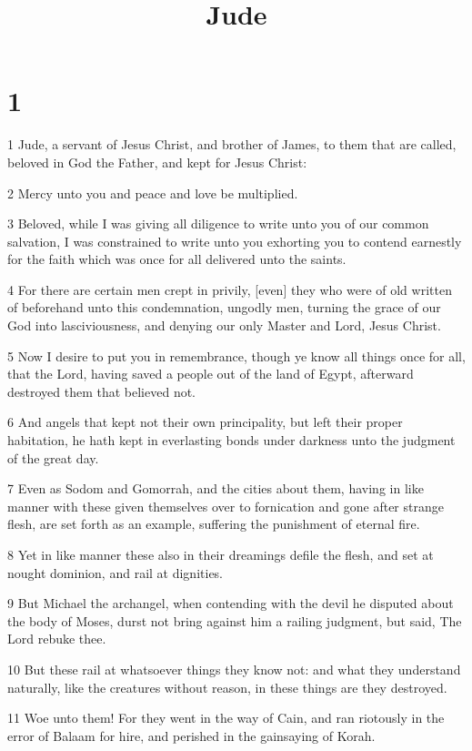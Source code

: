 

\title{Jude}

\chapter{1}

\par 1 Jude, a servant of Jesus Christ, and brother of James, to them that are called, beloved in God the Father, and kept for Jesus Christ:
\par 2 Mercy unto you and peace and love be multiplied.
\par 3 Beloved, while I was giving all diligence to write unto you of our common salvation, I was constrained to write unto you exhorting you to contend earnestly for the faith which was once for all delivered unto the saints.
\par 4 For there are certain men crept in privily, [even] they who were of old written of beforehand unto this condemnation, ungodly men, turning the grace of our God into lasciviousness, and denying our only Master and Lord, Jesus Christ.
\par 5 Now I desire to put you in remembrance, though ye know all things once for all, that the Lord, having saved a people out of the land of Egypt, afterward destroyed them that believed not.
\par 6 And angels that kept not their own principality, but left their proper habitation, he hath kept in everlasting bonds under darkness unto the judgment of the great day.
\par 7 Even as Sodom and Gomorrah, and the cities about them, having in like manner with these given themselves over to fornication and gone after strange flesh, are set forth as an example, suffering the punishment of eternal fire.
\par 8 Yet in like manner these also in their dreamings defile the flesh, and set at nought dominion, and rail at dignities.
\par 9 But Michael the archangel, when contending with the devil he disputed about the body of Moses, durst not bring against him a railing judgment, but said, The Lord rebuke thee.
\par 10 But these rail at whatsoever things they know not: and what they understand naturally, like the creatures without reason, in these things are they destroyed.
\par 11 Woe unto them! For they went in the way of Cain, and ran riotously in the error of Balaam for hire, and perished in the gainsaying of Korah.
